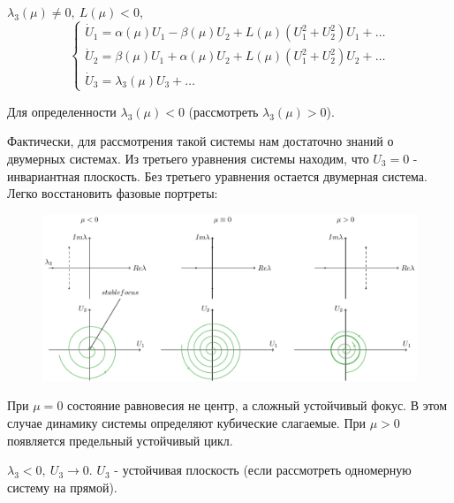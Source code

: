 $\lambda_3(\mu)\neq 0,~L(\mu)<0$,
\begin{equation}
	\begin{cases}
		\dot U_1 = \alpha(\mu)U_1-\beta(\mu)U_2+L(\mu)(U_1^2+U_2^2)U_1+\dots \\
		\dot U_2 = \beta(\mu)U_1+\alpha(\mu)U_2+L(\mu)(U_1^2+U_2^2)U_2+\dots \\
		\dot U_3 = \lambda_3(\mu)U_3+\dots
	\end{cases}
	\label{eq:108}	
\end{equation}

 Для определенности $\lambda_3(\mu)<0$ (рассмотреть $\lambda_3(\mu)>0$).

 Фактически, для рассмотрения такой системы нам достаточно знаний о двумерных системах. Из третьего уравнения системы находим, что $U_3=0$ - инвариантная плоскость. Без третьего уравнения остается двумерная система. Легко восстановить фазовые портреты:
 \begin{figure}[H]
	\centering
	\includegraphics[width=1\linewidth]{fig/fig54.pdf}   
\end{figure}

При $\mu=0$ состояние равновесия не центр, а сложный устойчивый фокус. В этом случае динамику системы определяют кубические слагаемые. При $\mu>0$ появляется предельный устойчивый цикл. 

$\lambda_3<0,~U_3 \rightarrow 0$. $U_3$ - устойчивая плоскость (если рассмотреть одномерную систему на прямой).

